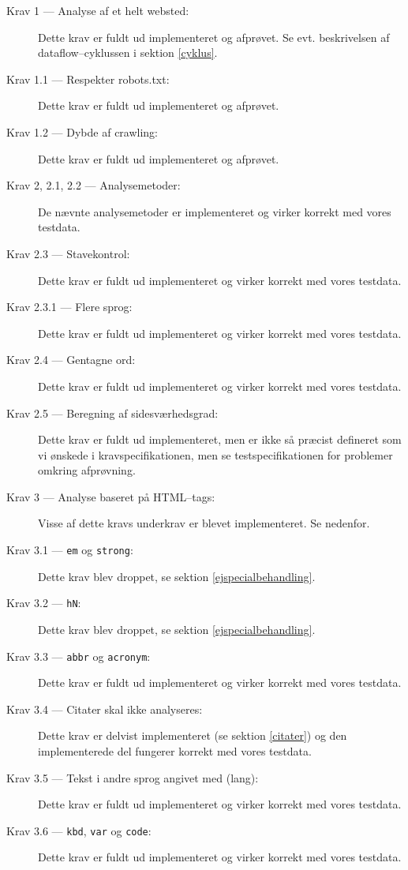 \documentclass[a4paper,oneside]{memoir}
\begin{document}
\begin{description}
\item[Krav 1 --- Analyse af et helt websted:] Dette krav er fuldt ud
  implementeret og afprøvet. Se
  evt. beskrivelsen af dataflow--cyklussen i sektion \ref{cyklus}.
\item[Krav 1.1 --- Respekter robots.txt:] Dette krav er fuldt ud
  implementeret og afprøvet.
\item[Krav 1.2 --- Dybde af crawling:] Dette krav er fuldt ud
  implementeret og afprøvet.
\item[Krav 2, 2.1, 2.2 --- Analysemetoder:] De nævnte analysemetoder er
  implementeret og virker korrekt med vores testdata.
\item[Krav 2.3 --- Stavekontrol:] Dette krav er fuldt ud implementeret og
  virker korrekt med vores testdata.
\item[Krav 2.3.1 --- Flere sprog:] Dette krav er fuldt ud implementeret og
  virker korrekt med vores testdata.
\item[Krav 2.4 --- Gentagne ord:] Dette krav er fuldt ud implementeret og
  virker korrekt med vores testdata.
\item[Krav 2.5 --- Beregning af sidesværhedsgrad:] Dette krav er fuldt
  ud implementeret, men er ikke så præcist defineret som vi ønskede i
  kravspecifikationen, men se testspecifikationen for problemer
  omkring afprøvning.
\item[Krav 3 --- Analyse baseret på HTML--tags:] Visse af dette kravs
  underkrav er blevet implementeret. Se nedenfor.
\item[Krav 3.1 --- \texttt{em} og \texttt{strong}:] Dette krav blev
  droppet, se sektion \ref{ejspecialbehandling}.
\item[Krav 3.2 --- \texttt{hN}:] Dette krav blev droppet, se sektion
  \ref{ejspecialbehandling}.
\item[Krav 3.3 --- \texttt{abbr} og \texttt{acronym}:] Dette krav er
  fuldt ud implementeret og virker korrekt med vores testdata.
\item[Krav 3.4 --- Citater skal ikke analyseres:] Dette krav er
  delvist implementeret (se sektion \ref{citater}) og den
  implementerede del fungerer korrekt med vores testdata.
\item[Krav 3.5 --- Tekst i andre sprog angivet med (lang):] Dette krav er
  fuldt ud implementeret og virker korrekt med vores testdata.
\item[Krav 3.6 --- \texttt{kbd}, \texttt{var} og \texttt{code}:] Dette
  krav er fuldt ud implementeret og virker korrekt med vores testdata.

\end{description}
\end{document}
